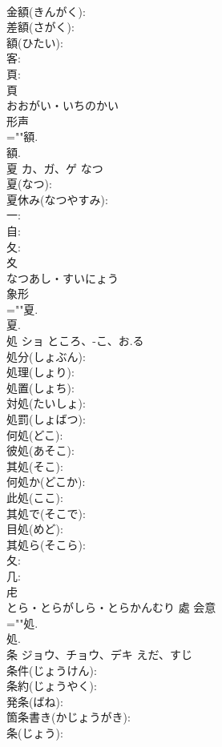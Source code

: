 \documentclass[8pt]{extreport}
\begin{document}
\begin{CJK}{UTF8}{min}
\\	金額(きんがく): 
\\	差額(さがく): 
\\	額(ひたい): 
\\	客: 
\\	頁: 
\\	頁	
\\	おおがい・いちのかい	
\\	形声 
\\	=""額.
\\	額.
\\	夏	カ、ガ、ゲ	なつ		
\\	夏(なつ): 
\\	夏休み(なつやすみ): 
\\	一: 
\\	自: 
\\	夂: 
\\	夊	
\\	なつあし・すいにょう	
\\	象形 
\\	=""夏.
\\	夏.
\\	処	ショ	ところ、-こ、お.る		
\\	処分(しょぶん): 
\\	処理(しょり): 
\\	処置(しょち): 
\\	対処(たいしょ): 
\\	処罰(しょばつ): 
\\	何処(どこ): 
\\	彼処(あそこ): 
\\	其処(そこ): 
\\	何処か(どこか): 
\\	此処(ここ): 
\\	其処で(そこで): 
\\	目処(めど): 
\\	其処ら(そこら): 
\\	夂: 
\\	几: 
\\	虍	
\\	とら・とらがしら・とらかんむり	處	会意 
\\	=""処.
\\	処.
\\	条	ジョウ、チョウ、デキ	えだ、すじ		
\\	条件(じょうけん): 
\\	条約(じょうやく): 
\\	発条(ばね): 
\\	箇条書き(かじょうがき): 
\\	条(じょう): 

\end{CJK}
\end{document}
